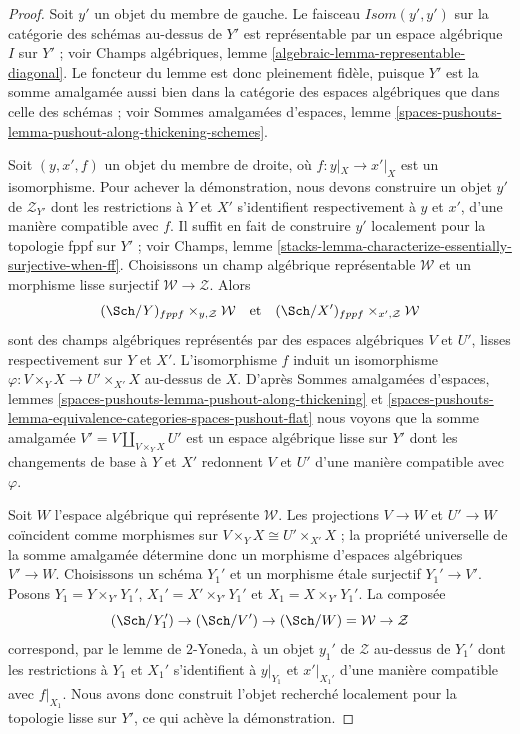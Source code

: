 \begin{proof}
Soit $y'$ un objet du membre de gauche. Le faisceau
$\mathit{Isom}(y', y')$ sur la catégorie des schémas au-dessus de $Y'$ est
représentable par un espace algébrique $I$ sur $Y'$ ; voir Champs algébriques,
lemme \ref{algebraic-lemma-representable-diagonal}. Le foncteur du lemme est
donc pleinement fidèle, puisque $Y'$ est la somme amalgamée aussi bien dans la
catégorie des espaces algébriques que dans celle des schémas ; voir Sommes
amalgamées d'espaces, lemme
\ref{spaces-pushouts-lemma-pushout-along-thickening-schemes}.

\medskip\noindent
Soit $(y,x',f)$ un objet du membre de droite, où
$f : y|_X \to x'|_X$ est un isomorphisme. Pour achever la démonstration, nous
devons construire un objet $y'$ de $\mathcal{Z}_{Y'}$ dont les restrictions à
$Y$ et $X'$ s'identifient respectivement à $y$ et $x'$, d'une manière
compatible avec $f$. Il suffit en fait de construire $y'$ localement pour la
topologie fppf sur $Y'$ ; voir Champs, lemme
\ref{stacks-lemma-characterize-essentially-surjective-when-ff}. Choisissons un
champ algébrique représentable $\mathcal{W}$ et un morphisme lisse surjectif
$\mathcal{W} \to \mathcal{Z}$. Alors
$$
(\Sch/Y)_{fppf} \times_{y, \mathcal{Z}} \mathcal{W}
\quad\text{et}\quad
(\Sch/X')_{fppf} \times_{x', \mathcal{Z}} \mathcal{W}
$$
sont des champs algébriques représentés par des espaces algébriques $V$ et
$U'$, lisses respectivement sur $Y$ et $X'$. L'isomorphisme $f$ induit un
isomorphisme $\varphi : V \times_Y X \to U' \times_{X'} X$ au-dessus de $X$.
D'après Sommes amalgamées d'espaces, lemmes
\ref{spaces-pushouts-lemma-pushout-along-thickening} et
\ref{spaces-pushouts-lemma-equivalence-categories-spaces-pushout-flat}
nous voyons que la somme amalgamée $V' = V \amalg_{V \times_Y X} U'$ est un
espace algébrique lisse sur $Y'$ dont les changements de base à $Y$ et $X'$
redonnent $V$ et $U'$ d'une manière compatible avec $\varphi$.

\medskip\noindent
Soit $W$ l'espace algébrique qui représente $\mathcal{W}$. Les projections
$V \to W$ et $U' \to W$ coïncident comme morphismes sur
$V \times_Y X \cong U' \times_{X'} X$ ; la propriété universelle de la somme
amalgamée détermine donc un morphisme d'espaces algébriques $V' \to W$.
Choisissons un schéma $Y_1'$ et un morphisme étale surjectif $Y_1' \to V'$.
Posons $Y_1 = Y \times_{Y'} Y_1'$, $X_1' = X' \times_{Y'} Y_1'$ et
$X_1 = X \times_{Y'} Y_1'$. La composée
$$
(\Sch/Y_1') \to (\Sch/V') \to (\Sch/W) = \mathcal{W} \to \mathcal{Z}
$$
correspond, par le lemme de $2$-Yoneda, à un objet $y_1'$ de $\mathcal{Z}$
au-dessus de $Y_1'$ dont les restrictions à $Y_1$ et $X_1'$ s'identifient à
$y|_{Y_1}$ et $x'|_{X_1'}$ d'une manière compatible avec $f|_{X_1}$. Nous
avons donc construit l'objet recherché localement pour la topologie lisse sur
$Y'$, ce qui achève la démonstration.
\end{proof}









